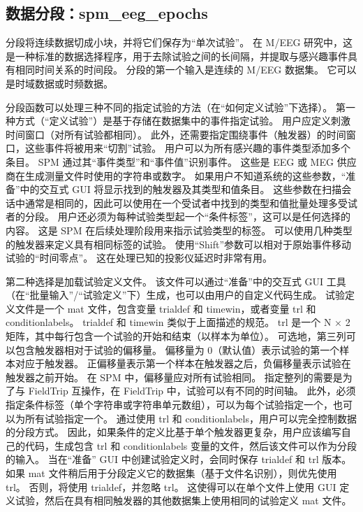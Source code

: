 \subsection{数据分段：spm\_eeg\_epochs}

分段将连续数据切成小块，并将它们保存为“单次试验”。
在 M/EEG 研究中，这是一种标准的数据选择程序，用于去除试验之间的长间隔，并提取与感兴趣事件具有相同时间关系的时间段。
分段的第一个输入是连续的 M/EEG 数据集。
它可以是时域数据或时频数据。

分段函数可以处理三种不同的指定试验的方法（在“如何定义试验”下选择）。
第一种方式（“定义试验”）是基于存储在数据集中的事件指定试验。
用户应定义刺激时间窗口（对所有试验都相同）。
此外，还需要指定围绕事件（触发器）的时间窗口，这些事件将被用来“切割”试验。
用户可以为所有感兴趣的事件类型添加多个条目。
SPM 通过其“事件类型”和“事件值”识别事件。
这些是 EEG 或 MEG 供应商在生成测量文件时使用的字符串或数字。
如果用户不知道系统的这些参数，“准备”中的交互式 GUI 将显示找到的触发器及其类型和值条目。
这些参数在扫描会话中通常是相同的，因此可以使用在一个受试者中找到的类型和值批量处理多受试者的分段。
用户还必须为每种试验类型起一个“条件标签”，这可以是任何选择的内容。
这是 SPM 在后续处理阶段用来指示试验类型的标签。
可以使用几种类型的触发器来定义具有相同标签的试验。
使用“Shift”参数可以相对于原始事件移动试验的“时间零点”。
这在处理已知的投影仪延迟时非常有用。

第二种选择是加载试验定义文件。
该文件可以通过“准备”中的交互式 GUI 工具（在“批量输入”/“试验定义”下）生成，也可以由用户的自定义代码生成。
试验定义文件是一个 mat 文件，包含变量 trialdef 和 timewin，或者变量 trl 和 conditionlabels。
trialdef 和 timewin 类似于上面描述的规范。
trl 是一个 N × 2 矩阵，其中每行包含一个试验的开始和结束（以样本为单位）。
可选地，第三列可以包含触发器相对于试验的偏移量。
偏移量为 0（默认值）表示试验的第一个样本对应于触发器。
正偏移量表示第一个样本在触发器之后，负偏移量表示试验在触发器之前开始。
在 SPM 中，偏移量应对所有试验相同。
指定整列的需要是为了与 FieldTrip 互操作，在 FieldTrip 中，试验可以有不同的时间轴。
此外，必须指定条件标签（单个字符串或字符串单元数组），可以为每个试验指定一个，也可以为所有试验指定一个。
通过使用 trl 和 conditionlabels，用户可以完全控制数据的分段方式。
因此，如果条件的定义比基于单个触发器更复杂，用户应该编写自己的代码，生成包含 trl 和 conditionlabels 变量的文件，然后该文件可以作为分段的输入。
当在“准备” GUI 中创建试验定义时，会同时保存 trialdef 和 trl 版本。
如果 mat 文件稍后用于分段定义它的数据集（基于文件名识别），则优先使用 trl。
否则，将使用 trialdef，并忽略 trl。
这使得可以在单个文件上使用 GUI 定义试验，然后在具有相同触发器的其他数据集上使用相同的试验定义 mat 文件。

